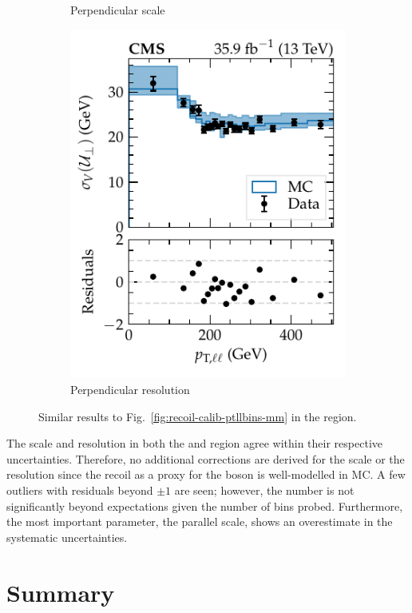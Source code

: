 \begin{figure}[htb]
\begin{subfigure}[b]{0.49\textwidth}
        \caption{Perpendicular scale}
        \label{subfigc:recoil-calib-ptllbins-ee}
    \end{subfigure}
    \hfill
    \begin{subfigure}[b]{0.49\textwidth}
        \centering
        \includegraphics{chapters/041_corrections/images/ptmiss_calib/metres_ee_sigmav_perp.pdf}
        \caption{Perpendicular resolution}
        \label{subfigd:recoil-calib-ptllbins-ee}
    \end{subfigure}
    \caption[Recoil scale and resolution in the dielectron final state.]{
        Similar results to Fig.~\ref{fig:recoil-calib-ptllbins-mm} in the \dieleplusjets region.
    }
    \label{fig:recoil-calib-ptllbins-ee}
\end{figure}
%
The scale and resolution in both the \dimuplusjets and \dieleplusjets region
agree within their respective uncertainties. Therefore, no additional
corrections are derived for the scale or the resolution since the recoil as a
proxy for the boson \pt is well-modelled in MC. A few outliers with residuals
beyond $\pm 1$ are seen; however, the number is not significantly beyond
expectations given the number of bins probed. Furthermore, the most important
parameter, the parallel scale, shows an overestimate in the systematic
uncertainties.

\clearpage
\section{Summary}

